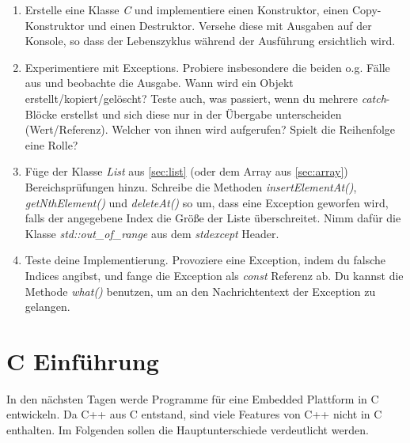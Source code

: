 \begin{enumerate}
\item 
Erstelle eine Klasse \emph{C} und implementiere einen Konstruktor, einen Copy-Konstruktor und einen Destruktor.
Versehe diese mit Ausgaben auf der Konsole, so dass der Lebenszyklus während der Ausführung ersichtlich wird.

\item 
Experimentiere mit Exceptions.
Probiere insbesondere die beiden o.g. Fälle aus und beobachte die Ausgabe. 
Wann wird ein Objekt erstellt/kopiert/gelöscht? 
Teste auch, was passiert, wenn du mehrere \emph{catch}-Blöcke erstellst und sich diese nur in der Übergabe unterscheiden (Wert/Referenz). Welcher von ihnen wird aufgerufen?
Spielt die Reihenfolge eine Rolle?

\item
Füge der Klasse \emph{List} aus \ref{sec:list} (oder dem Array aus \ref{sec:array}) Bereichsprüfungen hinzu.
Schreibe die Methoden \emph{insertElementAt()}, \emph{getNthElement()} und \emph{deleteAt()} so um, dass eine Exception geworfen wird, falls der angegebene Index die Größe der Liste überschreitet. 
Nimm dafür die Klasse \emph{std::out\_of\_range} aus dem \emph{stdexcept} Header.

\item
Teste deine Implementierung.
Provoziere eine Exception, indem du falsche Indices angibst, und fange die Exception als \emph{const} Referenz ab. Du kannst die Methode \emph{what()} benutzen, um an den Nachrichtentext der Exception zu gelangen.

\end{enumerate}


\section{C Einführung}
In den nächsten Tagen werde Programme für eine Embedded Plattform in C entwickeln. 
Da C++ aus C entstand, sind viele Features von C++ nicht in C enthalten. Im Folgenden sollen die Hauptunterschiede verdeutlicht werden.

